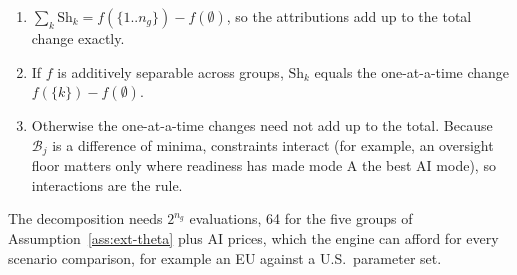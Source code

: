 \begin{proposition}\label{prop:ext-shapley}
\begin{enumerate}
\item[(a)] $\sum_k\mathrm{Sh}_k=f(\{1..n_g\})-f(\emptyset)$, so the attributions add up to the total change exactly.
\item[(b)] If $f$ is additively separable across groups, $\mathrm{Sh}_k$ equals the one-at-a-time change $f(\{k\})-f(\emptyset)$.
\item[(c)] Otherwise the one-at-a-time changes need not add up to the total. Because $\mathcal B_j$ is a difference of minima, constraints interact (for example, an oversight floor matters only where readiness has made mode A the best AI mode), so interactions are the rule.
\end{enumerate}
\end{proposition}

The decomposition needs $2^{n_g}$ evaluations, 64 for the five groups of Assumption~\ref{ass:ext-theta} plus AI prices, which the engine can afford for every scenario comparison, for example an EU against a U.S.\ parameter set.

